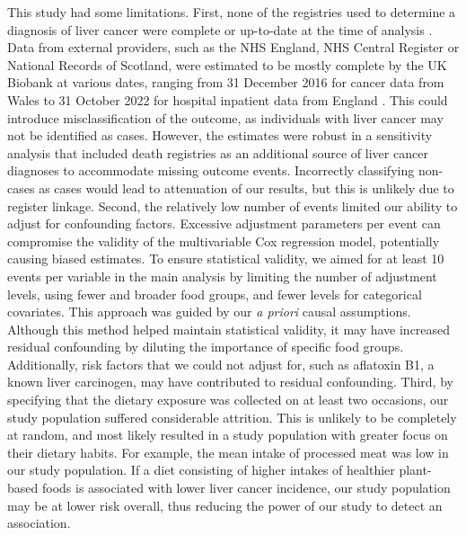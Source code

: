 \documentclass[nutrients,article,submit,moreauthors,pdftex]{Definitions/mdpi}
\begin{document}
This study had some limitations. First, none of the registries used to
determine a diagnosis of liver cancer were complete or up-to-date at the
time of analysis \citep{RN112}. Data from external providers, such as
the NHS England, NHS Central Register or National Records of Scotland,
were estimated to be mostly complete by the UK Biobank at various dates,
ranging from 31 December 2016 for cancer data from Wales to 31 October
2022 for hospital inpatient data from England \citep{RN114}. This could
introduce misclassification of the outcome, as individuals with liver
cancer may not be identified as cases. However, the estimates were
robust in a sensitivity analysis that included death registries as an
additional source of liver cancer diagnoses to accommodate missing
outcome events. Incorrectly classifying non-cases as cases would lead to
attenuation of our results, but this is unlikely due to register
linkage. Second, the relatively low number of events limited our ability
to adjust for confounding factors. Excessive adjustment parameters per
event can compromise the validity of the multivariable Cox regression
model, potentially causing biased estimates. To ensure statistical
validity, we aimed for at least 10 events per variable in the main
analysis by limiting the number of adjustment levels, using fewer and
broader food groups, and fewer levels for categorical covariates. This
approach was guided by our \emph{a priori} causal assumptions. Although
this method helped maintain statistical validity, it may have increased
residual confounding by diluting the importance of specific food groups.
Additionally, risk factors that we could not adjust for, such as
aflatoxin B1, a known liver carcinogen, may have contributed to residual
confounding. Third, by specifying that the dietary exposure was
collected on at least two occasions, our study population suffered
considerable attrition. This is unlikely to be completely at random, and
most likely resulted in a study population with greater focus on their
dietary habits. For example, the mean intake of processed meat was low
in our study population. If a diet consisting of higher intakes of
healthier plant-based foods is associated with lower liver cancer
incidence, our study population may be at lower risk overall, thus
reducing the power of our study to detect an association.
\end{document}
